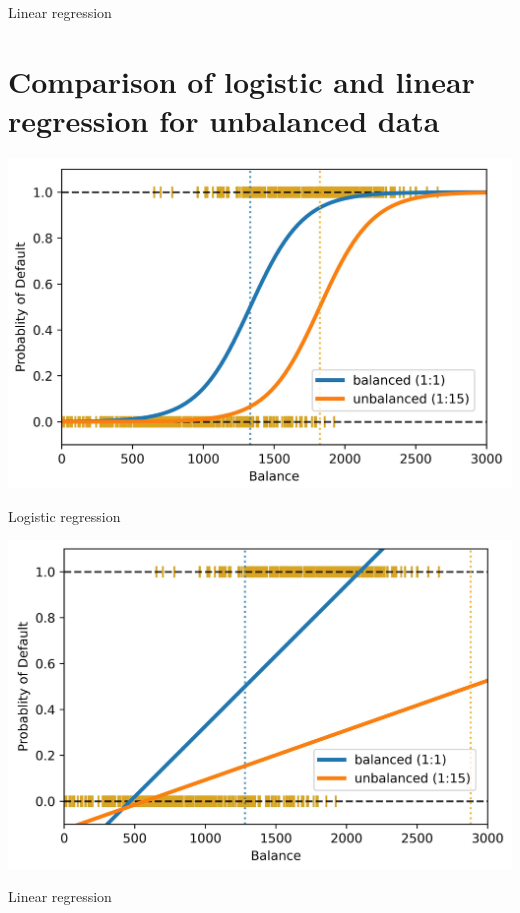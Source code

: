 \documentclass[10pt]{article}
\begin{document}
Linear regression

\section*{Comparison of logistic and linear regression for unbalanced data}
\begin{center}
\includegraphics[max width=\textwidth]{2023_12_30_261a5c67f471a6c49904g-07(1)}
\end{center}

Logistic regression

\begin{center}
\includegraphics[max width=\textwidth]{2023_12_30_261a5c67f471a6c49904g-07}
\end{center}

Linear regression
\end{document}
